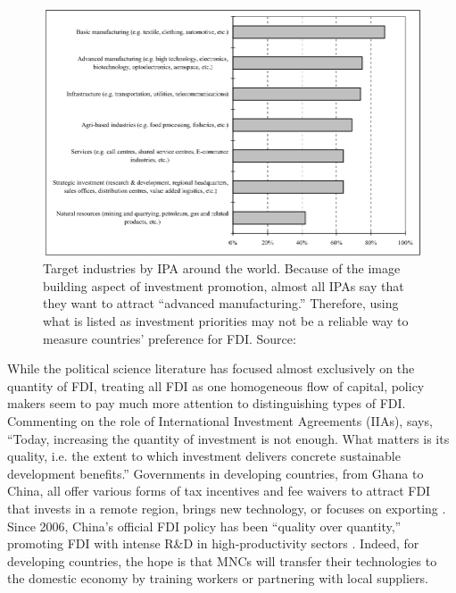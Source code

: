 \begin{figure}[!ht] \centering
\includegraphics[width=\textwidth,keepaspectratio]{../figure/IPA_target_industries}
  \caption[Target industries by IPA around the world.]{Target industries by IPA around the world. Because of the image
building aspect of investment promotion, almost all IPAs say that they want to
attract ``advanced manufacturing.'' Therefore, using what is listed as
investment priorities may not be a reliable way to measure countries' preference
for FDI. Source: \citet{UNCTAD2001}}
  \label{fig:IPA_target_industries}
\end{figure}

While the political science literature has focused almost exclusively on the
quantity of FDI, treating all FDI as one homogeneous flow of capital, policy
makers seem to pay much more attention to distinguishing types of FDI.
Commenting on the role of International Investment Agreements (IIAs),
\citet{UNCTAD2015} says, ``Today, increasing the quantity of investment is not
enough. What matters is its quality, i.e. the extent to which investment
delivers concrete sustainable development benefits.'' Governments in developing
countries, from Ghana to China, all offer various forms of tax incentives and
fee waivers to attract FDI that invests in a remote region, brings new
technology, or focuses on exporting \citep{Ricupero2000}. Since 2006, China's
official FDI policy has been ``quality over quantity,'' promoting FDI with
intense R\&D in high-productivity sectors \citep{Guangzhou2011}. Indeed, for
developing countries, the hope is that MNCs will transfer their technologies to
the domestic economy by training workers or partnering with local suppliers.

